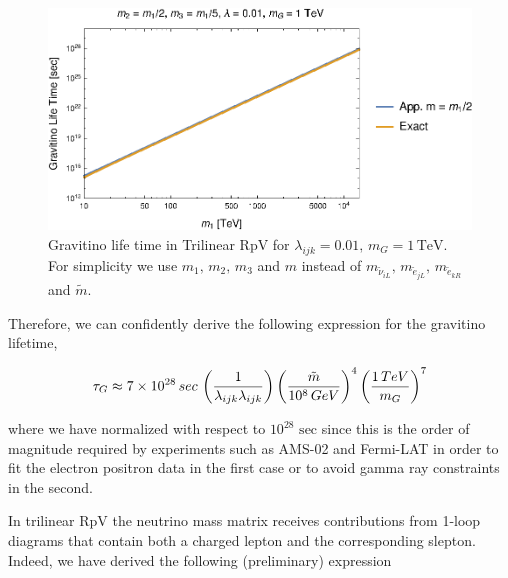 \documentclass[a4paper,11pt]{article}
\begin{document}
\begin{figure}
\begin{centering}
\includegraphics[scale=0.8]{GravitinoDecaym1m2m3Final}
\par\end{centering}

\caption{\label{fig:Gravitino-life-time}Gravitino life time in Trilinear RpV
for $\lambda_{ijk}=0.01,\,m_{G}=1\,\mbox{TeV}$. For simplicity we
use $m_{1},\,m_{2},\,m_{3}$ and $m$ instead of $m_{\tilde{\nu}_{iL}},\,m_{\tilde{e}_{jL}},\,m_{\tilde{e}_{kR}}$
and $\tilde{m}$.}
\end{figure}


Therefore, we can confidently derive the following expression for
the gravitino lifetime,

\begin{equation}
\tau_{G}\approx7\times10^{28}\,\mbox{sec}\,\left(\frac{1}{\lambda_{ijk}\lambda_{ijk}}\right)\left(\frac{\tilde{m}}{10^{8}\mbox{\,GeV}}\right)^{4}\left(\frac{1\,\mbox{TeV}}{m_{G}}\right)^{7}\label{eq:GravLifeTime}
\end{equation}


\noindent where we have normalized with respect to $10^{28}\mbox{ sec}$
since this is the order of magnitude required by experiments such
as AMS-02 and Fermi-LAT in order to fit the electron positron data
in the first case or to avoid gamma ray constraints in the second.



In trilinear RpV the neutrino mass matrix receives contributions from
1-loop diagrams that contain both a charged lepton and the corresponding
slepton. Indeed, we have derived the following (preliminary) expression
\end{document}
